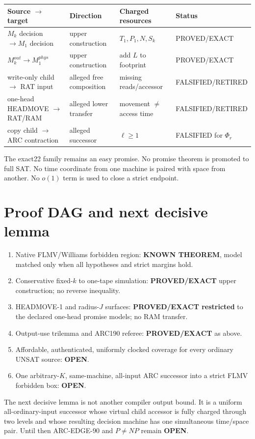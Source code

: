 \documentclass[11pt]{article}
\begin{document}
\begin{center}
\begin{tabular}{llll}
\toprule
Source $\to$ target & Direction & Charged resources & Status\\
\midrule
$M_k$ decision $\to M_1$ decision & upper construction & $T_1,P_1,N,S_k$ & PROVED/EXACT\\
$M_k^{out}\to M_1^{phys}$ & upper construction & add $L$ to footprint & PROVED/EXACT\\
write-only child $\to$ RAT input & alleged free composition & missing reads/accessor & FALSIFIED/RETIRED\\
one-head HEADMOVE $\to$ RAT/RAM & alleged lower transfer & movement $\ne$ access time & FALSIFIED/RETIRED\\
copy child $\to$ ARC contraction & alleged successor & $\ell\ge1$ & FALSIFIED for $\Phi_r$\\
\bottomrule
\end{tabular}
\end{center}

The exact22 family remains an easy promise.  No promise theorem is promoted
to full SAT.  No time coordinate from one machine is paired with space from
another.  No $o(1)$ term is used to close a strict endpoint.

\section{Proof DAG and next decisive lemma}
\begin{enumerate}
\item Native FLMV/Williams forbidden region: \textbf{KNOWN THEOREM}, model
matched only when all hypotheses and strict margins hold.
\item Conservative fixed-$k$ to one-tape simulation: \textbf{PROVED/EXACT}
upper construction; no reverse inequality.
\item HEADMOVE-1 and radius-$J$ surfaces: \textbf{PROVED/EXACT restricted}
to the declared one-head promise models; no RAM transfer.
\item Output-use trilemma and ARC190 referee: \textbf{PROVED/EXACT} as above.
\item Affordable, authenticated, uniformly clocked coverage for every
ordinary UNSAT source: \textbf{OPEN}.
\item One arbitrary-$K$, same-machine, all-input ARC successor into a strict
FLMV forbidden box: \textbf{OPEN}.
\end{enumerate}
The next decisive lemma is not another compiler output bound.  It is a
uniform all-ordinary-input successor whose virtual child accessor is fully
charged through two levels and whose resulting decision machine has one
simultaneous time/space pair.  Until then ARC-EDGE-90 and $P\ne NP$ remain
\textbf{OPEN}.
\end{document}
